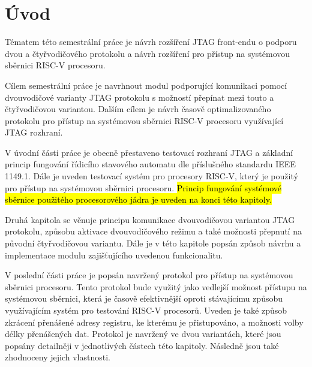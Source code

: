 \chapter*{Úvod}
{}

Tématem této semestrální práce je návrh rozšíření \acs{JTAG} front-endu o podporu dvou a čtyřvodičového protokolu a návrh rozšíření pro přístup na systémovou sběrnici \acs{RISC-V} procesoru.

Cílem semestrální práce je navrhnout modul podporující komunikaci pomocí dvouvodičové varianty \acs{JTAG} protokolu s možností přepínat mezi touto a čtyřvodičovou variantou. Dalším cílem je návrh časově optimalizovaného protokolu pro přístup na systémovou sběrnici \acs{RISC-V} procesoru využívající \acs{JTAG} rozhraní.

V úvodní části práce je obecně přestaveno testovací rozhraní \acs{JTAG} a základní princip fungování řídicího stavového automatu dle příslušného standardu IEEE 1149.1. Dále je uveden testovací systém pro procesory \acs{RISC-V}, který je použitý pro přístup na systémovou sběrnici procesoru. \hl{Princip fungování systémové sběrnice použitého procesorového jádra je uveden na konci této kapitoly.}

Druhá kapitola se věnuje principu komunikace dvouvodičovou variantou \acs{JTAG} protokolu, způsobu aktivace dvouvodičového režimu a také možnosti přepnutí na původní čtyřvodičovou variantu. Dále je v této kapitole popsán způsob návrhu a implementace modulu zajišťujícího uvedenou funkcionalitu.

V poslední části práce je popsán navržený protokol pro přístup na systémovou sběrnici procesoru. Tento protokol bude využitý jako vedlejší možnost přístupu na systémovou sběrnici, která je časově efektivnější oproti stávajícímu způsobu využívajícím systém pro testování \acs{RISC-V} procesorů. Uveden je také způsob zkrácení přenášené adresy registru, ke kterému je přistupováno, a možnosti volby délky přenášených dat. Protokol je navržený ve dvou variantách, které jsou popsány detailněji v jednotlivých částech této kapitoly. Následně jsou také zhodnoceny jejich vlastnosti.

